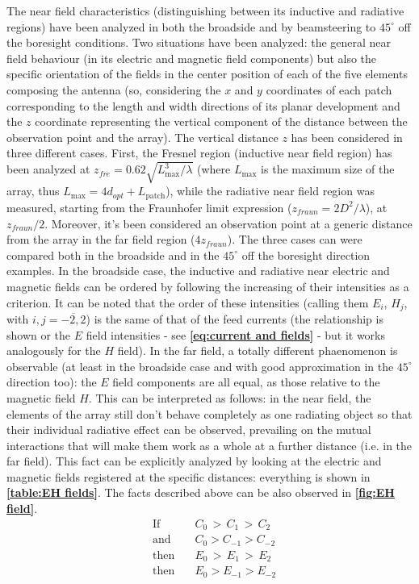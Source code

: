 \documentclass[10 pt,a4paper,twocolumn]{article}
\begin{document}
{The near field characteristics (distinguishing between its inductive and radiative regions) have been analyzed in both the broadside and by beamsteering to $45^\circ$ off the boresight conditions. Two situations have been analyzed: the general near field behaviour (in its electric and magnetic field components) but also the specific orientation of the fields in the center position of each of the five elements composing the antenna (so, considering the $x$ and $y$ coordinates of each patch corresponding to the length and width directions of its planar development and the $z$ coordinate representing the vertical component of the distance between the observation point and the array). The vertical distance $z$ has been considered in three different cases. First, the Fresnel region (inductive near field region) has been analyzed at {\small$z_{fre}=0.62\sqrt{L_{\max}^3/\lambda}$ (where $L_{\max}$} is the maximum size of the array, thus $L_{\max}=4d_{opt}+L_{\operatorname{patch}}$), while the radiative near field region was measured, starting from the Fraunhofer limit expression ($z_{fraun}=2D^2/\lambda$), at $z_{fraun}/2$. Moreover, it's been considered an observation point at a generic distance from the array in the far field region ($4z_{fraun}$). The three cases can were compared both in the broadside and in the $45^\circ$ off the boresight direction examples. In the broadside case, the inductive and radiative near electric and magnetic fields can be ordered by following the increasing of their intensities as a criterion. It can be noted that the order of these intensities (calling them $E_i$, $H_j$, with {\small$i,j=\overline{-2,2}$}) is the same of that of the feed currents (the relationship is shown or the $E$ field intensities - see \textbf{\cref{eq:current and fields}} - but it works analogously for the $H$ field). In the far field, a totally different phaenomenon is observable (at least in the broadside case and with good approximation in the $45^\circ$ direction too): the $E$ field components are all equal, as those relative to the magnetic field $H$. This can be interpreted as follows: in the near field, the elements of the array still don't behave completely as one radiating object so that their individual radiative effect can be observed, prevailing on the mutual interactions that will make them work as a whole at a further distance (i.e. in the far field). This fact can be explicitly analyzed by looking at the electric and magnetic fields registered at the specific distances: everything is shown in \textbf{\cref{table:EH fields}}. The facts described above can be also observed in \textbf{\cref{fig:EH field}}.
\begin{equation}
	\begin{aligned}
	&\text{If}\quad &C_0\,>\,C_{1}\,>\,C_2\\
	&\text{and} \quad &C_0>C_{-1}>C_{-2}\\
	&\text{then} \quad &E_0\,>\,E_{1}\,>\,E_2\\
	&\text{then} \quad  &E_0>E_{-1}>E_{-2}\\
	\end{aligned}
\label{eq:current and fields}
\end{equation}
}
\end{document}
